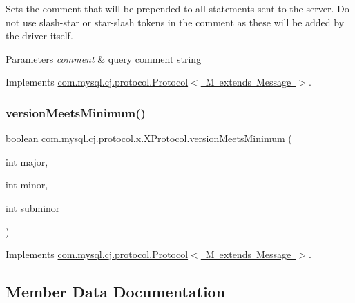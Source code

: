 Sets the comment that will be prepended to all statements sent to the server. Do not use slash-\/star or star-\/slash tokens in the comment as these will be added by the driver itself.


\begin{DoxyParams}{Parameters}
{\em comment} & query comment string \\
\hline
\end{DoxyParams}


Implements \mbox{\hyperlink{interfacecom_1_1mysql_1_1cj_1_1protocol_1_1_protocol_ace5604859b8b79df6dcf91bee7c1cc6c}{com.\+mysql.\+cj.\+protocol.\+Protocol$<$ M extends Message $>$}}.

\mbox{\label{classcom_1_1mysql_1_1cj_1_1protocol_1_1x_1_1_x_protocol_a8895e989b506fa14b82358935c6b34f2}} 
\subsubsection{\texorpdfstring{version\+Meets\+Minimum()}{versionMeetsMinimum()}}
{\footnotesize\ttfamily boolean com.\+mysql.\+cj.\+protocol.\+x.\+X\+Protocol.\+version\+Meets\+Minimum (\begin{DoxyParamCaption}\item[{int}]{major,  }\item[{int}]{minor,  }\item[{int}]{subminor }\end{DoxyParamCaption})}



Implements \mbox{\hyperlink{interfacecom_1_1mysql_1_1cj_1_1protocol_1_1_protocol_ace7057295ed6873e77e7998bbf5fa082}{com.\+mysql.\+cj.\+protocol.\+Protocol$<$ M extends Message $>$}}.



\subsection{Member Data Documentation}
\mbox{\label{classcom_1_1mysql_1_1cj_1_1protocol_1_1x_1_1_x_protocol_a641b0957f0f852d23d88c15b4b1539e2}} 
